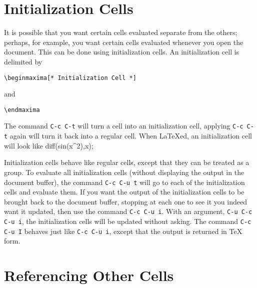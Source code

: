 \documentclass{article}
\begin{document}
\section{Initialization Cells}

\noindent
It is possible that you want certain cells evaluated separate from the
others; perhaps, for example, you want certain cells evaluated whenever
you open the document.  This can be done using initialization cells.
An initialization cell is delimited by
\begin{verbatim}
\beginmaxima[* Initialization Cell *]
\end{verbatim}
\noindent
and
\begin{verbatim}
\endmaxima
\end{verbatim}
\noindent
The command \texttt{C-c C-t} will turn a cell into
an initialization cell, applying \texttt{C-c C-t} again will turn it
back into a regular cell.  
When \LaTeX{}ed, an initialization cell will look like
diff(sin(x^2),x);
\endmaxima

Initialization cells behave like regular
cells, except that they can be treated as a group.
To evaluate all initialization cells (without displaying the output in
the document buffer), the
command \texttt{C-c C-u t} will go to each of the
initialization cells and evaluate them.
If you want the output of the initialization cells to be brought back 
to the document buffer,  stopping at each one to see it
you indeed want it updated, then use the command \texttt{C-c C-u i}.
With an argument, \texttt{C-u C-c C-u i}, the
initialization cells will be updated without asking.   The command 
\texttt{C-c C-u I} behaves just like \texttt{C-c C-u i},
except that the output is returned in \TeX{} form.

\section{Referencing Other Cells}
\end{document}
